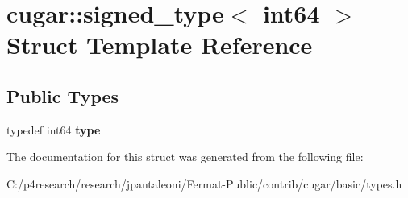 \hypertarget{structcugar_1_1signed__type_3_01int64_01_4}{}\section{cugar\+:\+:signed\+\_\+type$<$ int64 $>$ Struct Template Reference}
\label{structcugar_1_1signed__type_3_01int64_01_4}
\subsection*{Public Types}
\begin{DoxyCompactItemize}
\item 
\mbox{\label{structcugar_1_1signed__type_3_01int64_01_4_a2470386c53b4d73d598621312c6bf751}} 
typedef int64 {\bfseries type}
\end{DoxyCompactItemize}


The documentation for this struct was generated from the following file\+:\begin{DoxyCompactItemize}
\item 
C\+:/p4research/research/jpantaleoni/\+Fermat-\/\+Public/contrib/cugar/basic/types.\+h\end{DoxyCompactItemize}
